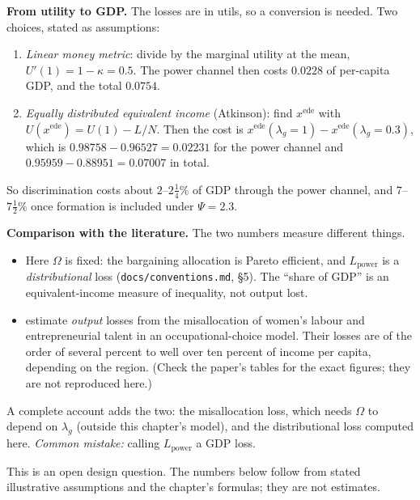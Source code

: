 \documentclass[../solutions_manual.tex]{subfiles}
\begin{document}
\textbf{From utility to GDP.} The losses are in utils, so a conversion is needed. Two choices, stated as assumptions:
\begin{enumerate}
\item \emph{Linear money metric}: divide by the marginal utility at the mean, $U'(1) = 1 - \kappa = 0.5$. The power channel then costs $0.0228$ of per-capita GDP, and the total $0.0754$.
\item \emph{Equally distributed equivalent income} (Atkinson): find $x^{\text{ede}}$ with $U(x^{\text{ede}}) = U(1) - L/N$. Then the cost is $x^{\text{ede}}(\lambda_g = 1) - x^{\text{ede}}(\lambda_g = 0.3)$, which is $0.98758 - 0.96527 = 0.02231$ for the power channel and $0.95959 - 0.88951 = 0.07007$ in total.
\end{enumerate}
So discrimination costs about $2$--$2\tfrac14\%$ of GDP through the power channel, and $7$--$7\tfrac12\%$ once formation is included under $\Psi = 2.3$.

\textbf{Comparison with the literature.} The two numbers measure different things.
\begin{itemize}
\item Here $\Omega$ is fixed: the bargaining allocation is Pareto efficient, and $L_{\text{power}}$ is a \emph{distributional} loss (\nolinkurl{docs/conventions.md}, \S5). The ``share of GDP'' is an equivalent-income measure of inequality, not output lost.
\item \citet{cuberes2016aggregate} estimate \emph{output} losses from the misallocation of women's labour and entrepreneurial talent in an occupational-choice model. Their losses are of the order of several percent to well over ten percent of income per capita, depending on the region. (Check the paper's tables for the exact figures; they are not reproduced here.)
\end{itemize}
A complete account adds the two: the misallocation loss, which needs $\Omega$ to depend on $\lambda_g$ (outside this chapter's model), and the distributional loss computed here. \emph{Common mistake:} calling $L_{\text{power}}$ a GDP loss.


This is an open design question. The numbers below follow from stated illustrative assumptions and the chapter's formulas; they are not estimates.
\end{document}
